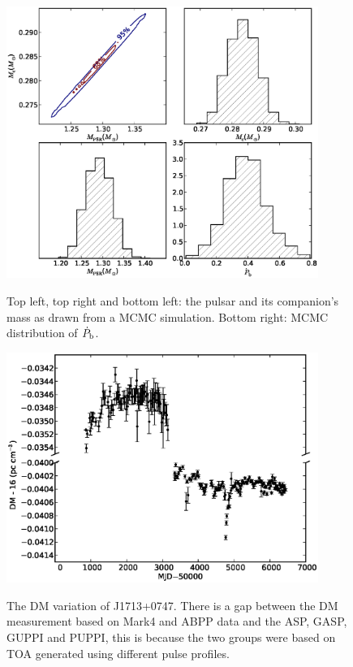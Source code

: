 \documentclass[12pt,preprint]{aastex}
\begin{document}
\begin{figure}
\includegraphics[width=4in]{masses.eps} \\ 
\caption {\label{fig:mass} Top left, top right and bottom left: the pulsar and its companion's mass as drawn from a MCMC simulation. Bottom right: MCMC distribution of $\dot{P}_{\rm b}$.} 
\end{figure} 

\begin{figure}
\includegraphics[width=4in]{DMX.ps} \\ 
\caption {\label{fig:dmx} The DM variation of J1713+0747. There is a gap
between the DM measurement based on Mark4 and ABPP data and the
ASP, GASP, GUPPI and PUPPI, this is because the two groups were based on TOA  
generated using different pulse profiles. } 
\end{figure} 
\end{document}
